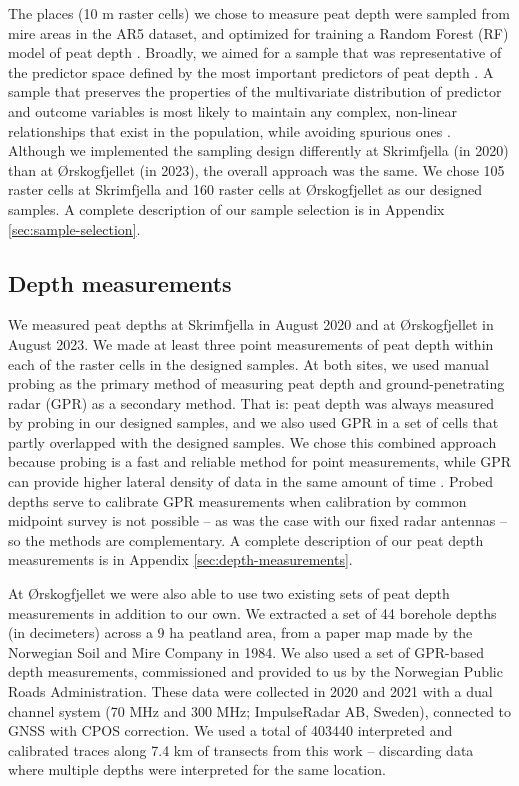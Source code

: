 \documentclass[soil, manuscript]{copernicus}
\begin{document}
The places (10 m raster cells) we chose to measure peat depth were sampled from mire areas in the AR5 dataset, and optimized for training a Random Forest (RF) model of peat depth \citep{brusSamplingDigitalSoil2019}.
Broadly, we aimed for a sample that was representative of the predictor space defined by the most important predictors of peat depth \citep{wadouxSamplingDesignOptimization2019, maComparisonConditionedLatin2020}.
A sample that preserves the properties of the multivariate distribution of predictor and outcome variables is most likely to maintain any complex, non-linear relationships that exist in the population, while avoiding spurious ones \citep{brusSamplingDigitalSoil2019}.
Although we implemented the sampling design differently at Skrimfjella (in 2020) than at Ørskogfjellet (in 2023), the overall approach was the same.
We chose 105 raster cells at Skrimfjella and 160 raster cells at Ørskogfjellet as our designed samples.
A complete description of our sample selection is in Appendix \ref{sec:sample-selection}.

\subsection{Depth measurements}

We measured peat depths at Skrimfjella in August 2020 and at Ørskogfjellet in August 2023.
We made at least three point measurements of peat depth within each of the raster cells in the designed samples.
At both sites, we used manual probing as the primary method of measuring peat depth and ground-penetrating radar (GPR) as a secondary method.
That is: peat depth was always measured by probing in our designed samples, and we also used GPR in a set of cells that partly overlapped with the designed samples.
We chose this combined approach because probing is a fast and reliable method for point measurements, while GPR can provide higher lateral density of data in the same amount of time \citep{parryEvaluatingApproachesEstimating2014}.
Probed depths serve to calibrate GPR measurements when calibration by common midpoint survey is not possible -- as was the case with our fixed radar antennas -- so the methods are complementary.
A complete description of our peat depth measurements is in Appendix \ref{sec:depth-measurements}.

At Ørskogfjellet we were also able to use two existing sets of peat depth measurements in addition to our own.
We extracted a set of 44 borehole depths (in decimeters) across a 9 ha peatland area, from a paper map made by the Norwegian Soil and Mire Company in 1984.
We also used a set of GPR-based depth measurements, commissioned and provided to us by the Norwegian Public Roads Administration.
These data were collected in 2020 and 2021 with a dual channel system (70 MHz and 300 MHz; ImpulseRadar AB, Sweden), connected to GNSS with CPOS correction.
We used a total of 403440 interpreted and calibrated traces along 7.4 km of transects from this work -- discarding data where multiple depths were interpreted for the same location.
\end{document}
